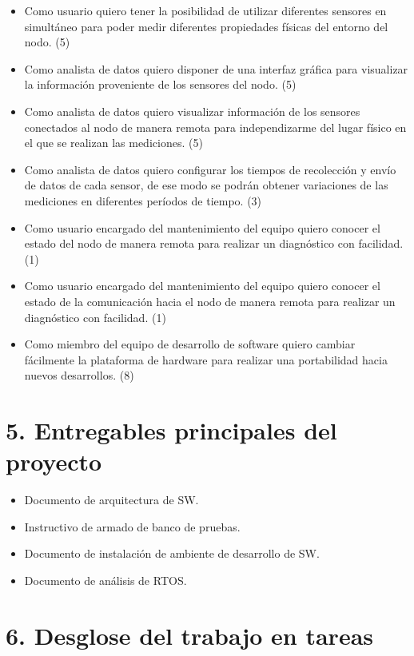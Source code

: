 \documentclass[11pt]{charter}
\begin{document}
\begin{itemize}
\item Como usuario quiero tener la posibilidad de utilizar diferentes sensores en simultáneo para poder medir diferentes propiedades físicas del entorno del nodo. (5)
\item Como analista de datos quiero disponer de una interfaz gráfica para visualizar la información proveniente de los sensores del nodo. (5)
\item Como analista de datos quiero visualizar información de los sensores conectados al nodo de manera remota para independizarme del lugar físico en el que se realizan las mediciones. (5)
\item Como analista de datos quiero configurar los tiempos de recolección y envío de datos de cada sensor, de ese modo se podrán obtener variaciones de las mediciones en diferentes períodos de tiempo. (3)
\item Como usuario encargado del mantenimiento del equipo quiero conocer el estado del nodo de manera remota para realizar un diagnóstico con facilidad. (1)
\item Como usuario encargado del mantenimiento del equipo quiero conocer el estado de la comunicación hacia el nodo de manera remota para realizar un diagnóstico con facilidad. (1)
\item Como miembro del equipo de desarrollo de software quiero cambiar fácilmente la plataforma de hardware para realizar una portabilidad hacia nuevos desarrollos. (8)
\end{itemize}

\section{5. Entregables principales del proyecto}
\label{sec:entregables}

\begin{itemize}
\item Documento de arquitectura de SW.
\item Instructivo de armado de banco de pruebas.
\item Documento de instalación de ambiente de desarrollo de SW.
\item Documento de análisis de RTOS.

\end{itemize}


\section{6. Desglose del trabajo en tareas}
\label{sec:wbs}
\end{document}
